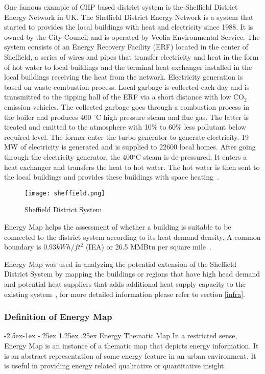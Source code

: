 \documentclass[hidelinks,12pt]{article}
\makeatletter
\renewcommand\paragraph{\@startsection{paragraph}{4}{\z@}%
            {-2.5ex\@plus -1ex \@minus -.25ex}%
            {1.25ex \@plus .25ex}%
            {\normalfont\normalsize\bfseries}}
\makeatother
\begin{document}
One famous example of CHP based district system is the Sheffield
District Energy Network in UK. The Sheffield District Energy Network
is a system that started to provides the local buildings with heat and
electricity since 1988. It is owned by the City Council and is
operated by Veolia Environmental Service. The system consists of an
Energy Recovery Facility (ERF) located in the center of Sheffield, a
series of wires and pipes that transfer electricity and heat in the
form of hot water to local buildings and the terminal heat exchanger
installed in the local buildings receiving the heat from the
network. Electricity generation is based on waste combustion
process. Local garbage is collected each day and is transmitted to the
tipping hall of the ERF via a short distance with low CO$_2$ emission
vehicles. The collected garbage goes through a combustion process in
the boiler and produces 400 $^{\circ}$C high pressure steam and flue
gas. The latter is treated and emitted to the atmosphere with 10\% to
60\% less pollutant below required level. The former enter the turbo
generator to generate electricity. 19 MW of electricity is generated
and is supplied to 22600 local homes. After going through the
electricity generator, the 400$^\circ$C steam is de-pressured. It
enters a heat exchanger and transfers the heat to hot water. The hot
water is then sent to the local buildings and provides these buildings
with space heating~\cite{veolia2014}. 
\begin{figure}[htbp]
  \centering
  \texttt{[image: sheffield.png]}
  \caption{Sheffield District System}
  \label{fig:sheffield}
\end{figure}

Energy Map helps the assessment of whether a building is suitable to
be connected to the district system according to its heat demand
density. A common boundary is 0.93$kWh/ft^2$ (IEA) or 26.5 MMBtu per
square mile~\cite{IDEA2012}.

Energy Map was used in analyzing the potential extension of the
Sheffield District System by mapping the buildings or regions that
have high head demand and potential heat suppliers that adds
additional heat supply capacity to the existing
system~\cite{Finney2012165}, for more detailed information please
refer to section \ref{infra}.

\subsubsection{Definition of Energy Map}
\paragraph{Energy Thematic Map}
In a restricted sense, Energy Map is an instance of a thematic map
that depicts energy information. It is an abstract representation of
some energy feature in an urban environment. It is useful in providing
energy related qualitative or quantitative insight. 
\end{document}
